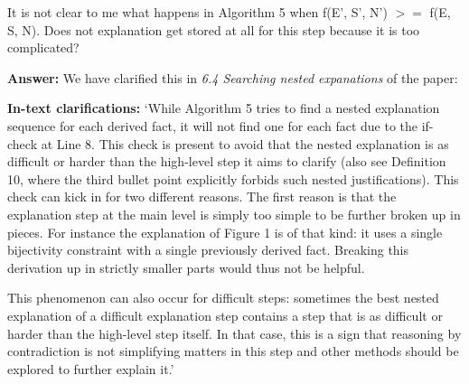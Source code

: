 \documentclass{article}
\newcommand\comment[1]{\marginpar{\tiny #1}}
\renewcommand\comment[1]{#1}
\newcommand{\tias}[1]{{\comment{\color{blue}\textsc{TG:}#1}}}
\newcommand{\emilio}[1]{{\comment{\color{red} \textsc{EG:}#1}}}
\newcommand{\answer}[1]{{\comment{\textbf{Answer:} #1}}}
\newcommand{\clarification}[1]{{\comment{\textbf{In-text clarifications:} #1}}}
\newcommand{\tempanswer}[1]{{\comment{\color{orange} \textbf{Temporary answer:} #1}}}
\newcommand{\bart}[1]{{\comment{\color{green} \textsc{BB:}#1}}}
\begin{document}


\begin{quoteit}
It is not clear to me what happens in Algorithm 5 when f(E', S', N') $>=$ f(E, S, N). Does not explanation get stored at all for this step because it is too complicated? 
\end{quoteit}

\answer{We have clarified this in \emph{6.4 Searching nested expanations} of the paper:}

\clarification{
		`While Algorithm 5 tries to find a nested explanation sequence for each derived fact, it will not find one for each fact due to the if-check at Line 8. 
		This check is present to avoid that the nested explanation is as difficult or harder than the high-level step it aims to clarify (also see Definition 10, where the third bullet point explicitly forbids such nested justifications).  
		This check can kick in for two different reasons. The first reason is that the explanation step at the main level is simply too simple to be further broken up in pieces. For instance the explanation of Figure 1 is of that kind: it uses a single bijectivity constraint with a single previously derived fact. Breaking this derivation up in strictly smaller parts would thus not be helpful. 
		
		This phenomenon can also occur for difficult steps: sometimes the best nested explanation of a difficult explanation step contains a step that is as difficult or harder than the high-level step itself. In that case, this is a sign that reasoning by contradiction is not simplifying matters in this step and other methods should be explored to further explain it.'}
\end{document}
